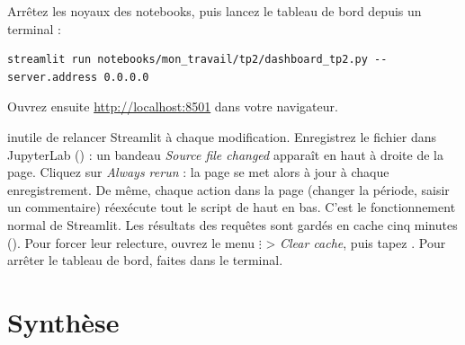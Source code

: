 Arrêtez les noyaux des notebooks, puis lancez le tableau de bord depuis un terminal :
\begin{lstlisting}[style=shell]
streamlit run notebooks/mon_travail/tp2/dashboard_tp2.py --server.address 0.0.0.0
\end{lstlisting}
Ouvrez ensuite \url{http://localhost:8501} dans votre navigateur.

\begin{astuce}
inutile de relancer Streamlit à chaque modification. Enregistrez le fichier dans JupyterLab
() : un bandeau \emph{Source file changed} apparaît en haut à droite de la page. Cliquez
sur \emph{Always rerun} : la page se met alors à jour à chaque enregistrement. De même, chaque
action dans la page (changer la période, saisir un commentaire) réexécute tout le script de haut en
bas. C'est le fonctionnement normal de Streamlit. Les résultats des requêtes sont gardés en cache
cinq minutes (). Pour forcer leur relecture, ouvrez le menu \emph{\(\vdots\)} >
\emph{Clear cache}, puis tapez . Pour arrêter le tableau de bord, faites  dans le terminal.
\end{astuce}


\section{Synthèse}\label{c4:sec:livrables}

